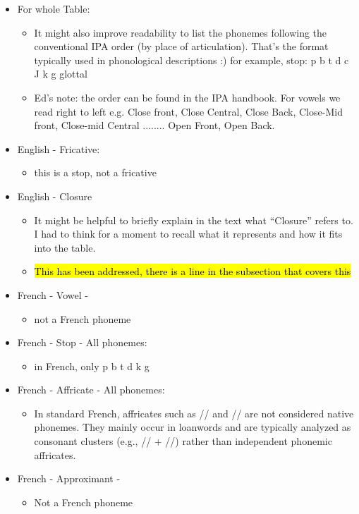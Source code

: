 \begin{itemize}
    \item For whole Table:
    \begin{itemize}
        \item It might also improve readability to list the phonemes following the conventional IPA order (by place of articulation). That’s the format typically used in phonological descriptions :) for example, stop: p b t d c J k g glottal
        \item Ed's note: the order can be found in the IPA handbook. For vowels we read right to left e.g. Close front, Close Central, Close Back, Close-Mid front, Close-mid Central ........  Open Front, Open Back.
    \end{itemize}
    \item English - Fricative: 
    \begin{itemize}
        \item this is a stop, not a fricative
    \end{itemize}
    \item English - Closure
    \begin{itemize}
        \item It might be helpful to briefly explain in the text what “Closure” refers to. I had to think for a moment to recall what it represents and how it fits into the table.
        \item \hl{This has been addressed, there is a line in the subsection that covers this}
    \end{itemize}
    \item French - Vowel - \textipa{\ae}
    \begin{itemize}
        \item not a French phoneme
    \end{itemize}
    \item French - Stop - All phonemes:
    \begin{itemize}
        \item in French, only p b t d k g
    \end{itemize}
    \item French - Affricate - All phonemes:
    \begin{itemize}
        \item In standard French, affricates such as // and // are not considered native phonemes. They mainly occur in loanwords and are typically analyzed as consonant clusters (e.g., // + //) rather than independent phonemic affricates.
    \end{itemize}
    \item French - Approximant - 
    \begin{itemize}
        \item Not a French phoneme
    \end{itemize}
\end{itemize}


